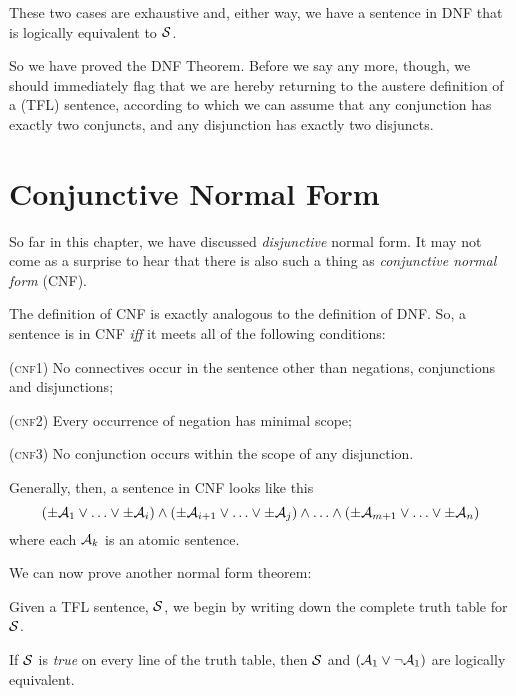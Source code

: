 	These two cases are exhaustive and, either way, we have a sentence in DNF that is logically equivalent to $\mathcal{S}$.

So we have proved the DNF Theorem. Before we say any more, though, we should immediately flag that we are hereby returning to the austere definition of a (TFL) sentence, according to which we can assume that any conjunction has exactly two conjuncts, and any disjunction has exactly two disjuncts.


\section{Conjunctive Normal Form}
\label{s:CNF}

So far in this chapter, we have discussed \emph{disjunctive} normal form. It may not come as a surprise to hear that there is also such a thing as \emph{conjunctive normal form} (CNF).

The definition of CNF is exactly analogous to the definition of DNF. So, a sentence is in CNF \emph{iff} it meets all of the following conditions:
	\begin{earg}
		\item[(\textsc{cnf1})] No connectives occur in the sentence other than negations, conjunctions and disjunctions;
		\item[(\textsc{cnf2})] Every occurrence of negation has minimal scope;
		\item[(\textsc{cnf3})] No conjunction occurs within the scope of any disjunction. 
	\end{earg}
Generally, then, a sentence in CNF looks like this
	$$(\pm \mathcal{A}_1 \lor \ldots \lor \pm \mathcal{A}_i) \land (\pm \mathcal{A}_{i+1} \lor \ldots \lor \pm\mathcal{A}_j) \land \ldots \land (\pm\mathcal{A}_{m+1} \lor\ldots \lor \pm \mathcal{A}_n)$$
where each $\mathcal{A}_k$ is an atomic sentence.

We can now prove another normal form theorem:

        
	Given a TFL sentence, $\mathcal{S}$, we begin by writing down the complete truth table for $\mathcal{S}$.
	
	If $\mathcal{S}$ is \emph{true} on every line of the truth table, then $\mathcal{S}$ and $(\mathcal{A}_1 \vee \neg \mathcal{A}_1)$ are logically equivalent.
	
